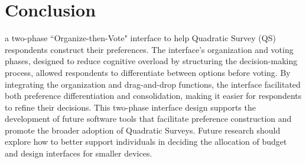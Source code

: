 \section{Conclusion}
 a two-phase ``Organize-then-Vote" interface to help Quadratic Survey (QS) respondents construct their preferences.  The interface’s organization and voting phases, designed to reduce cognitive overload by structuring the decision-making process, allowed respondents to differentiate between options before voting.  By integrating the organization and drag-and-drop functions, the interface facilitated both preference differentiation and consolidation, making it easier for respondents to refine their decisions. This two-phase interface design supports the development of future software tools that facilitate preference construction and promote the broader adoption of Quadratic Surveys. Future research should explore how to better support individuals in deciding the allocation of budget and design interfaces for smaller devices.

